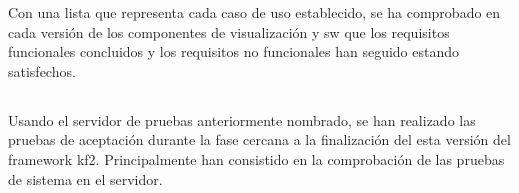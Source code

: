 Con una lista que representa cada caso de uso establecido, se ha comprobado en cada versión de los componentes de visualización y \gls{sw} que los requisitos funcionales concluidos y los requisitos no funcionales han seguido estando satisfechos.





\subsection{}
Usando el servidor de pruebas anteriormente nombrado, se han realizado las pruebas de aceptación durante la fase cercana a la finalización del esta versión del \gls{framework} \gls{kf2}. Principalmente han consistido en la comprobación de las pruebas de sistema en el servidor.



